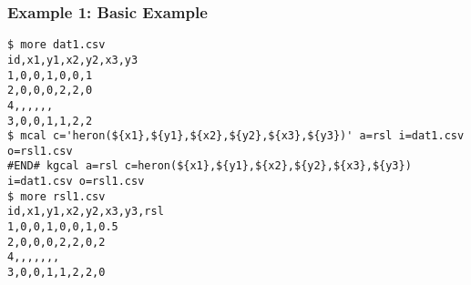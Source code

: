 \subsubsection*{Example 1: Basic Example}



\begin{Verbatim}[baselinestretch=0.7,frame=single]
$ more dat1.csv
id,x1,y1,x2,y2,x3,y3
1,0,0,1,0,0,1
2,0,0,0,2,2,0
4,,,,,,
3,0,0,1,1,2,2
$ mcal c='heron(${x1},${y1},${x2},${y2},${x3},${y3})' a=rsl i=dat1.csv o=rsl1.csv
#END# kgcal a=rsl c=heron(${x1},${y1},${x2},${y2},${x3},${y3}) i=dat1.csv o=rsl1.csv
$ more rsl1.csv
id,x1,y1,x2,y2,x3,y3,rsl
1,0,0,1,0,0,1,0.5
2,0,0,0,2,2,0,2
4,,,,,,,
3,0,0,1,1,2,2,0
\end{Verbatim}
